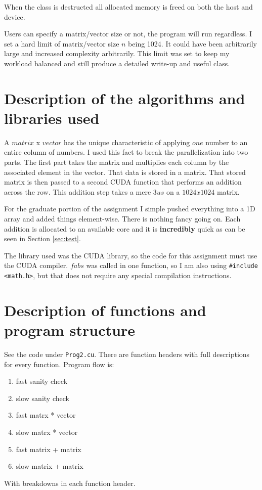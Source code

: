 \documentclass{article}
\begin{document}
When the class is destructed all allocated memory is freed on both the host and 
device.

Users can specify a matrix/vector size or not, the program will run regardless. 
I set a hard limit of matrix/vector size $n$ being 1024. It could have been 
arbitrarily large and increased complexity arbitrarily. This limit was set to 
keep my workload balanced and still produce a detailed write-up and useful 
class.


\section{Description of the algorithms and libraries used}
A $matrix$ x $vector$ has the unique characteristic of applying $one$ number to 
an entire column of numbers. I used this fact to break the parallelization into 
two parts. The first part takes the matrix and multiplies each column by the 
associated element in the vector. That data is stored in a matrix. That stored 
matrix is then passed to a second CUDA function that performs an addition across 
the row. This addition step takes a mere $3us$ on a $1024x1024$ matrix.

For the graduate portion of the assignment I simple pushed everything into a 1D 
array and added things element-wise. There is nothing fancy going on. Each 
addition is allocated to an available core and it is \textbf{incredibly} quick 
as can be seen in Section \ref{sec:test}.

The library used was the CUDA library, so the code for this assignment must use 
the CUDA compiler. $fabs$ was called in one function, so I am also using 
\verb|#include <math.h>|, but that does not require any special compilation 
instructions.


\section{Description of functions and program structure}
See the code under \verb|Prog2.cu|. There are function headers with full 
descriptions for every function. Program flow is:
\begin{enumerate}
    \item fast sanity check
    \item slow sanity check
    \item fast matrx * vector
    \item slow matrx * vector
    \item fast matrix + matrix
    \item slow matrix + matrix
\end{enumerate}
With breakdowns in each function header.
\end{document}
